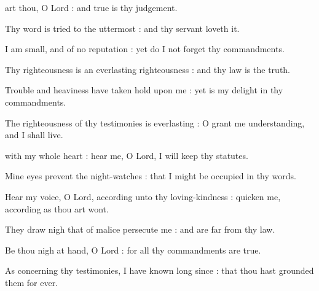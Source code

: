  art thou, O Lord : and true is thy judgement.\par
{}
Thy word is tried to the uttermost : and thy servant loveth it.\par
{}I am small, and of no reputation : yet do I not forget thy commandments.\par
{}Thy righteousness is an everlasting righteousness : and thy law is the truth.\par
{}Trouble and heaviness have taken hold upon me : yet is my delight in thy commandments.\par
{}The righteousness of thy testimonies is everlasting : O grant me understanding, and I shall live.\par


 with my whole heart : hear me, O Lord, I will keep thy statutes.\par
{}
Mine eyes prevent the night-watches : that I might be occupied in thy words.\par
{}Hear my voice, O Lord, according unto thy loving-kindness : quicken me, according as thou art wont.\par
{}They draw nigh that of malice persecute me : and are far from thy law.\par
{}Be thou nigh at hand, O Lord : for all thy commandments are true.\par
{}As concerning thy testimonies, I have known long since : that thou hast grounded them for ever.\par

